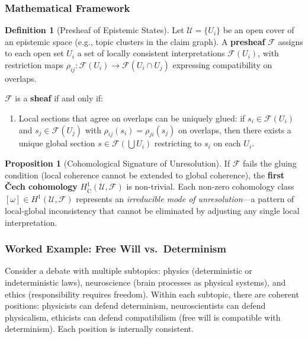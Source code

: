 \documentclass[11pt,letterpaper]{article}
\theoremstyle{definition}
\newtheorem{definition}{Definition}[section]
\newtheorem{proposition}{Proposition}[section]
\theoremstyle{remark}
\begin{document}
\subsubsection*{Mathematical Framework}

\begin{definition}[Presheaf of Epistemic States]
Let $\mathcal{U} = \{U_i\}$ be an open cover of an epistemic space (e.g., topic clusters in the claim graph). A \textbf{presheaf} $\mathcal{F}$ assigns to each open set $U_i$ a set of locally consistent interpretations $\mathcal{F}(U_i)$, with restriction maps $\rho_{ij}: \mathcal{F}(U_i) \to \mathcal{F}(U_i \cap U_j)$ expressing compatibility on overlaps.
\end{definition}

$\mathcal{F}$ is a \textbf{sheaf} if and only if:
\begin{enumerate}
\item Local sections that agree on overlaps can be uniquely glued: if $s_i \in \mathcal{F}(U_i)$ and $s_j \in \mathcal{F}(U_j)$ with $\rho_{ij}(s_i) = \rho_{ji}(s_j)$ on overlaps, then there exists a unique global section $s \in \mathcal{F}(\bigcup U_i)$ restricting to $s_i$ on each $U_i$.
\end{enumerate}

\begin{proposition}[Cohomological Signature of Unresolution]
If $\mathcal{F}$ fails the gluing condition (local coherence cannot be extended to global coherence), the \textbf{first Čech cohomology} $H^1_{\check{\mathrm{C}}}(\mathcal{U}, \mathcal{F})$ is non-trivial. Each non-zero cohomology class $[\omega] \in H^1(\mathcal{U}, \mathcal{F})$ represents an \emph{irreducible mode of unresolution}---a pattern of local-global inconsistency that cannot be eliminated by adjusting any single local interpretation.
\end{proposition}

\subsubsection*{Worked Example: Free Will vs.\ Determinism}

Consider a debate with multiple subtopics: physics (deterministic or indeterministic laws), neuroscience (brain processes as physical systems), and ethics (responsibility requires freedom). Within each subtopic, there are coherent positions: physicists can defend determinism, neuroscientists can defend physicalism, ethicists can defend compatibilism (free will is compatible with determinism). Each position is internally consistent.
\end{document}
